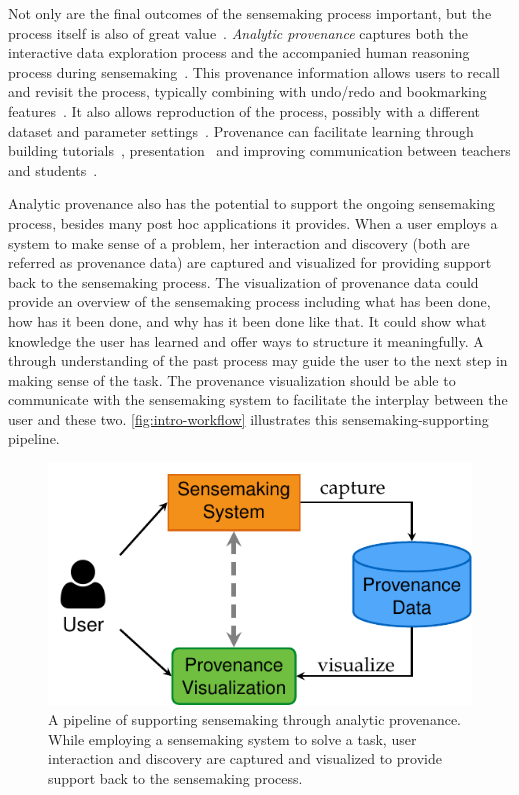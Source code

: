 Not only are the final outcomes of the sensemaking process important, but the process itself is also of great value~\cite{Ragan2016}. \emph{Analytic provenance} captures both the interactive data exploration process and the accompanied human reasoning process during sensemaking~\cite{Xu2015}. This provenance information allows users to recall and revisit the process, typically combining with undo/redo and bookmarking features~\cite{Heer2008}. It also allows reproduction of the process, possibly with a different dataset and parameter settings~\cite{Davidson2007}. Provenance can facilitate learning through building tutorials~\cite{Grabler2009}, presentation~\cite{Eccles2007} and improving communication between teachers and students~\cite{Plaisant1999}. 

Analytic provenance also has the potential to support the ongoing sensemaking process, besides many post hoc applications it provides. When a user employs a system to make sense of a problem, her interaction and discovery (both are referred as provenance data) are captured and visualized for providing support back to the sensemaking process. The visualization of provenance data could  provide an overview of the sensemaking process including what has been done, how has it been done, and why has it been done like that. It could show what knowledge the user has learned and offer ways to structure it meaningfully. A through understanding of the past process may guide the user to the next step in making sense of the task. The provenance visualization should be able to communicate with the sensemaking system to facilitate the interplay between the user and these two. \autoref{fig:intro-workflow} illustrates this sensemaking-supporting pipeline. 

\begin{figure}[!htb]
	\centering
	\includegraphics{workflow}
	\caption{A pipeline of supporting sensemaking through analytic provenance. While employing a sensemaking system to solve a task, user interaction and discovery are captured and visualized to provide support back to the sensemaking process.}
	\label{fig:intro-workflow}
\end{figure}

